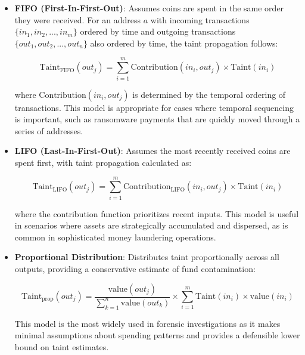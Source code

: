 \documentclass[conference]{IEEEtran}
\begin{document}
\begin{itemize}
    \item \textbf{FIFO (First-In-First-Out)}: Assumes coins are spent in the same order they were received. For an address $a$ with incoming transactions $\{in_1, in_2, ..., in_m\}$ ordered by time and outgoing transactions $\{out_1, out_2, ..., out_n\}$ also ordered by time, the taint propagation follows:
    
    \begin{equation}
    \text{Taint}_{\text{FIFO}}(out_j) = \sum_{i=1}^{m} \text{Contribution}(in_i, out_j) \times \text{Taint}(in_i)
    \end{equation}
    
    where $\text{Contribution}(in_i, out_j)$ is determined by the temporal ordering of transactions. This model is appropriate for cases where temporal sequencing is important, such as ransomware payments that are quickly moved through a series of addresses.
    
    \item \textbf{LIFO (Last-In-First-Out)}: Assumes the most recently received coins are spent first, with taint propagation calculated as:
    
    \begin{equation}
    \text{Taint}_{\text{LIFO}}(out_j) = \sum_{i=1}^{m} \text{Contribution}_{\text{LIFO}}(in_i, out_j) \times \text{Taint}(in_i)
    \end{equation}
    
    where the contribution function prioritizes recent inputs. This model is useful in scenarios where assets are strategically accumulated and dispersed, as is common in sophisticated money laundering operations.
    
    \item \textbf{Proportional Distribution}: Distributes taint proportionally across all outputs, providing a conservative estimate of fund contamination:
    
    \begin{equation}
    \text{Taint}_{\text{prop}}(out_j) = \frac{\text{value}(out_j)}{\sum_{k=1}^{n} \text{value}(out_k)} \times \sum_{i=1}^{m} \text{Taint}(in_i) \times \text{value}(in_i)
    \end{equation}
    
    This model is the most widely used in forensic investigations as it makes minimal assumptions about spending patterns and provides a defensible lower bound on taint estimates.
\end{itemize}
\end{document}
